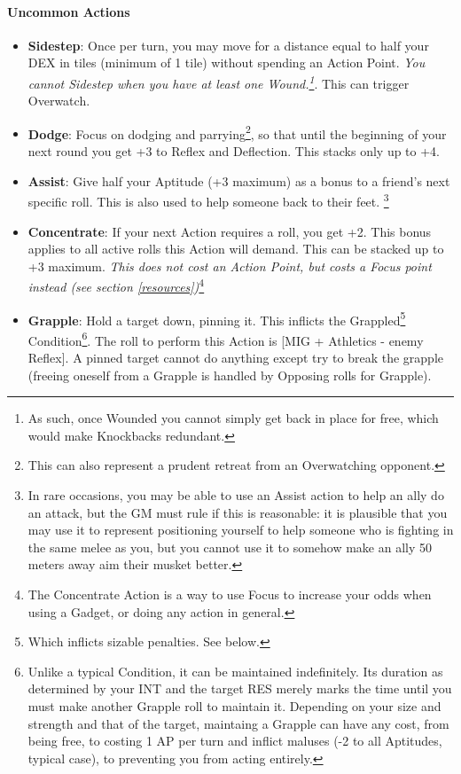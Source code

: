 \paragraph{Uncommon Actions}
\begin{itemize}
    \item \textbf{Sidestep}: Once per turn, you may move for a distance equal to half your DEX in tiles (minimum of 1 tile) without spending an Action Point. \textit{You cannot Sidestep when you have at least one Wound.\footnote{As such, once Wounded you cannot simply get back in place for free, which would make Knockbacks redundant.}}. This can trigger Overwatch.
    \item \textbf{Dodge}: Focus on dodging and parrying\footnote{This can also represent a prudent retreat from an Overwatching opponent.}, so that until the beginning of your next round you get +3 to Reflex and Deflection. This stacks only up to +4.
    \item \textbf{Assist}: Give half your Aptitude (+3 maximum) as a bonus to a friend's next specific roll. This is also used to help someone back to their feet. \footnote{In rare occasions, you may be able to use an Assist action to help an ally do an attack, but the GM must rule if this is reasonable: it is plausible that you may use it to represent positioning yourself to help someone who is fighting in the same melee as you, but you cannot use it to somehow make an ally 50 meters away aim their musket better.}
    \item \textbf{Concentrate}: If your next Action requires a roll, you get +2. This bonus applies to all active rolls this Action will demand. This can be stacked up to +3 maximum. \textit{This does not cost an Action Point, but costs a Focus point instead (see section \ref{resources})}\footnote{The Concentrate Action is a way to use Focus to increase your odds when using a Gadget, or doing any action in general.}
    \item \textbf{Grapple}: Hold a target down, pinning it. This inflicts the Grappled\footnote{Which inflicts sizable penalties. See below.} Condition\footnote{Unlike a typical Condition, it can be maintained indefinitely. Its duration as determined by your INT and the target RES merely marks the time until you must make another Grapple roll to maintain it. Depending on your size and strength and that of the target, maintaing a Grapple can have any cost, from being free, to costing 1 AP per turn and inflict maluses (-2 to all Aptitudes, typical case), to preventing you from acting entirely.}. The roll to perform this Action is [MIG + Athletics - enemy Reflex]. A pinned target cannot do anything except try to break the grapple (freeing oneself from a Grapple is handled by Opposing rolls for Grapple). \\

\end{itemize}
